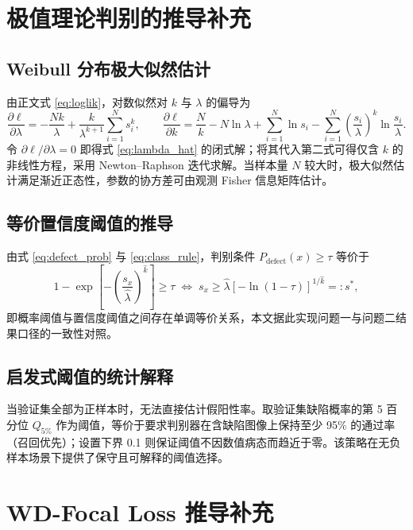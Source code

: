\section{极值理论判别的推导补充}

\subsection{Weibull 分布极大似然估计}

由正文式 \eqref{eq:loglik}，对数似然对 $k$ 与 $\lambda$ 的偏导为
\begin{equation}
  \frac{\partial \ell}{\partial \lambda}
  = -\frac{Nk}{\lambda} + \frac{k}{\lambda^{k+1}}\sum_{i=1}^{N}s_i^{k},
  \qquad
  \frac{\partial \ell}{\partial k}
  = \frac{N}{k} - N\ln\lambda + \sum_{i=1}^{N}\ln s_i
  - \sum_{i=1}^{N}\left(\frac{s_i}{\lambda}\right)^{k}\ln\frac{s_i}{\lambda}.
  \label{eq:score}
\end{equation}
令 $\partial\ell/\partial\lambda=0$ 即得式 \eqref{eq:lambda_hat} 的闭式解；将其代入第二式可得仅含 $k$ 的非线性方程，采用 Newton--Raphson 迭代求解。当样本量 $N$ 较大时，极大似然估计满足渐近正态性，参数的协方差可由观测 Fisher 信息矩阵估计。

\subsection{等价置信度阈值的推导}

由式 \eqref{eq:defect_prob} 与 \eqref{eq:class_rule}，判别条件 $P_{\mathrm{defect}}(x)\ge\tau$ 等价于
\begin{equation}
  1-\exp\!\left[-\left(\frac{s_x}{\hat{\lambda}}\right)^{\hat{k}}\right] \ge \tau
  \;\Longleftrightarrow\;
  s_x \ge \hat{\lambda}\left[-\ln(1-\tau)\right]^{1/\hat{k}} =: s^{*},
  \label{eq:equiv_derive}
\end{equation}
即概率阈值与置信度阈值之间存在单调等价关系，本文据此实现问题一与问题二结果口径的一致性对照。

\subsection{启发式阈值的统计解释}

当验证集全部为正样本时，无法直接估计假阳性率。取验证集缺陷概率的第 5 百分位 $Q_{5\%}$ 作为阈值，等价于要求判别器在含缺陷图像上保持至少 95\% 的通过率（召回优先）；设置下界 0.1 则保证阈值不因数值病态而趋近于零。该策略在无负样本场景下提供了保守且可解释的阈值选择。

\section{WD-Focal Loss 推导补充}

